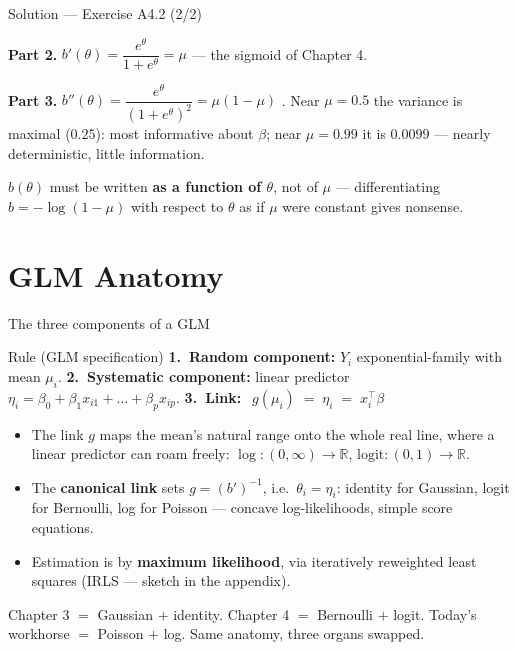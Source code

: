 \documentclass[aspectratio=169,11pt]{beamer}
\begin{document}
\begin{frame}{Solution --- Exercise A4.2 (2/2)}
\begin{solutionbox}
  \textbf{Part 2.} $b'(\theta) = \dfrac{e^{\theta}}{1+e^{\theta}} = \mu$ \checkmark ---
  the sigmoid of Chapter 4.

  \textbf{Part 3.} $b''(\theta) = \dfrac{e^{\theta}}{(1+e^{\theta})^2}
  = \mu(1-\mu)$ \checkmark. Near $\mu=0.5$ the variance is maximal ($0.25$): most
  informative about $\beta$; near $\mu = 0.99$ it is $0.0099$ --- nearly
  deterministic, little information.
\end{solutionbox}
\begin{mistake}
  $b(\theta)$ must be written \textbf{as a function of $\theta$}, not of $\mu$ ---
  differentiating $b = -\log(1-\mu)$ with respect to $\theta$ as if $\mu$ were
  constant gives nonsense.
\end{mistake}
\end{frame}

\section{GLM Anatomy}

\begin{frame}{The three components of a GLM}
  \footnotesize
  \begin{block}{Rule (GLM specification)}
    \footnotesize
    \textbf{1.\ Random component:} $Y_i$ exponential-family with mean $\mu_i$.\quad
    \textbf{2.\ Systematic component:} linear predictor
    $\eta_i = \beta_0 + \beta_1 x_{i1} + \dots + \beta_p x_{ip}$.\quad
    \textbf{3.\ Link:} $\;\boxed{\,g(\mu_i) \;=\; \eta_i \;=\; x_i^{\top}\beta\,}$
  \end{block}
  \begin{readme}
    \begin{itemize}
      \item The link $g$ maps the mean's natural range onto the whole real line, where
            a linear predictor can roam freely: $\log:(0,\infty)\to\mathbb{R}$,
            $\text{logit}:(0,1)\to\mathbb{R}$.
      \item The \textbf{canonical link} sets $g = (b')^{-1}$, i.e.\ $\theta_i = \eta_i$:
            identity for Gaussian, logit for Bernoulli, log for Poisson --- concave
            log-likelihoods, simple score equations.
      \item Estimation is by \textbf{maximum likelihood}, via iteratively reweighted
            least squares (IRLS --- sketch in the appendix).
    \end{itemize}
  \end{readme}
  \begin{takeaway}
    Chapter 3 $=$ Gaussian $+$ identity. Chapter 4 $=$ Bernoulli $+$ logit. Today's
    workhorse $=$ Poisson $+$ log. Same anatomy, three organs swapped.
  \end{takeaway}
\end{frame}
\end{document}
